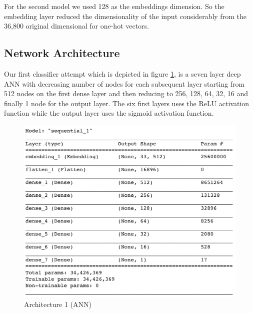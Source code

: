\documentclass[conference]{sig-alternate-05-2015}
\begin{document}
For the second model we used 128 as the embeddings dimension. So the  embedding layer reduced the dimensionality of the input considerably from the 36,800 original dimensional for one-hot vectors.

\subsection{Network Architecture}
Our first classifier attempt which is depicted in figure \ref{fig:model ANN}, is a seven layer deep ANN with decreasing number of nodes for each subsequent layer starting from 512 nodes on the first dense layer and then reducing to 256, 128, 64, 32, 16 and finally 1 node for the output layer. The six first layers uses the ReLU activation function while the output layer uses the sigmoid activation function.

\begin{figure}
	\centering
	\includegraphics[width=0.8\linewidth]{"Model_ANN"}
	\caption{Architecture 1 (ANN)}
	\label{fig:model ANN}
\end{figure}
\end{document}

